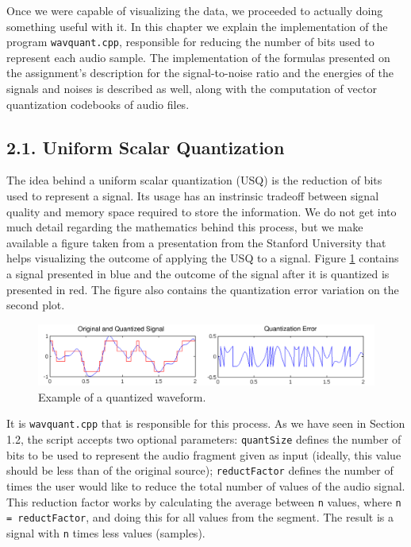 \documentclass[12pt]{article}
\begin{document}
Once we were capable of visualizing the data, we proceeded to actually doing 
something useful with it.
In this chapter we explain the implementation of the program \texttt{wavquant.cpp},
responsible for reducing the number of bits used to represent each audio sample.
The implementation of the formulas presented on the assignment's description for
the signal-to-noise ratio and the energies of the signals and noises is described
as well, along with the computation of vector quantization codebooks of audio files.

\subsection*{2.1. Uniform Scalar Quantization}

The idea behind a uniform scalar quantization (USQ) is the reduction of bits 
used to represent a signal.
Its usage has an instrinsic tradeoff between signal quality and memory space
required to store the information.
We do not get into much detail regarding the mathematics behind this process, 
but we make available a figure taken from a presentation from the Stanford 
University \cite{stanford} that helps visualizing the outcome of applying the 
USQ to a signal.
Figure \ref{fig:quantization} contains a signal presented in blue and the outcome
of the signal after it is quantized is presented in red. 
The figure also contains the quantization error variation on
the second plot.

\begin{figure}[H]
  \centering
  \begin{minipage}{\textwidth}
    \centering
    \includegraphics[width=\linewidth]{stanford_quantization_wide.png}
  \end{minipage}%
  \caption{Example of a quantized waveform.}
  \label{fig:quantization}
\end{figure}

It is \texttt{wavquant.cpp} that is responsible for this process.
As we have seen in Section 1.2, the script accepts two optional parameters:
\texttt{quantSize} defines the number of bits to be used to represent the audio 
fragment given as input (ideally, this value should be less than of the original 
source); \texttt{reductFactor} defines the number of times the user would like 
to reduce the total number of values of the audio signal.
This reduction factor works by calculating the average between \texttt{n} values, 
where \texttt{n = reductFactor}, and doing this for all values from the segment.
The result is a signal with \texttt{n} times less values (samples).
\end{document}
